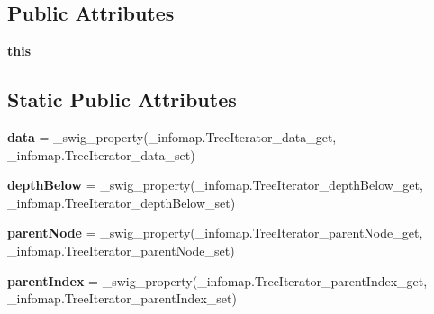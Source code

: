 \subsection*{Public Attributes}
\begin{DoxyCompactItemize}
\item 
\mbox{\label{classinfomapfolder_1_1infomap_1_1TreeIterator_ae2c95a5ec75ce3fb02354a8e381c6a9f}} 
{\bfseries this}
\end{DoxyCompactItemize}
\subsection*{Static Public Attributes}
\begin{DoxyCompactItemize}
\item 
\mbox{\label{classinfomapfolder_1_1infomap_1_1TreeIterator_af8b633ff96373070e66c6e72fe13daf0}} 
{\bfseries data} = \+\_\+swig\+\_\+property(\+\_\+infomap.\+Tree\+Iterator\+\_\+data\+\_\+get, \+\_\+infomap.\+Tree\+Iterator\+\_\+data\+\_\+set)
\item 
\mbox{\label{classinfomapfolder_1_1infomap_1_1TreeIterator_aed87f62d406c5cc4bcdcf2890b550e07}} 
{\bfseries depth\+Below} = \+\_\+swig\+\_\+property(\+\_\+infomap.\+Tree\+Iterator\+\_\+depth\+Below\+\_\+get, \+\_\+infomap.\+Tree\+Iterator\+\_\+depth\+Below\+\_\+set)
\item 
\mbox{\label{classinfomapfolder_1_1infomap_1_1TreeIterator_aa2d2a08eae33115f8076644a7daf024e}} 
{\bfseries parent\+Node} = \+\_\+swig\+\_\+property(\+\_\+infomap.\+Tree\+Iterator\+\_\+parent\+Node\+\_\+get, \+\_\+infomap.\+Tree\+Iterator\+\_\+parent\+Node\+\_\+set)
\item 
\mbox{\label{classinfomapfolder_1_1infomap_1_1TreeIterator_adb59c731147e32166847d99301b8857a}} 
{\bfseries parent\+Index} = \+\_\+swig\+\_\+property(\+\_\+infomap.\+Tree\+Iterator\+\_\+parent\+Index\+\_\+get, \+\_\+infomap.\+Tree\+Iterator\+\_\+parent\+Index\+\_\+set)
\item 
\mbox{\label{classinfomapfolder_1_1infomap_1_1TreeIterator_ad7443df3c829e493ac4a1dc1c6a6463b}} 

\end{DoxyCompactItemize}

